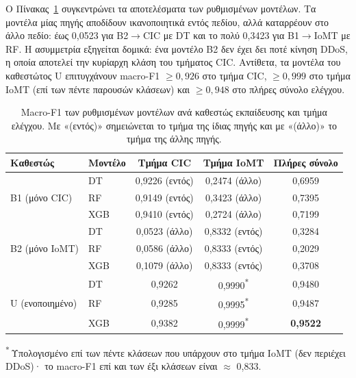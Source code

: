 Ο Πίνακας~\ref{gr:tab:regimes} συγκεντρώνει τα αποτελέσματα των ρυθμισμένων μοντέλων. Τα μοντέλα μίας πηγής αποδίδουν ικανοποιητικά εντός πεδίου, αλλά καταρρέουν στο άλλο πεδίο: έως 0,0523 για B2$\to$CIC με DT και το πολύ 0,3423 για B1$\to$IoMT με RF. Η ασυμμετρία εξηγείται δομικά: ένα μοντέλο B2 δεν έχει δει ποτέ κίνηση DDoS, η οποία αποτελεί την κυρίαρχη κλάση του τμήματος CIC. Αντίθετα, τα μοντέλα του καθεστώτος U επιτυγχάνουν macro-F1 $\geq 0{,}926$ στο τμήμα CIC, $\geq 0{,}999$ στο τμήμα IoMT (επί των πέντε παρουσών κλάσεων) και $\geq 0{,}948$ στο πλήρες σύνολο ελέγχου.

\begin{table}[!htbp]
\centering
\caption[]{Macro-F1 των ρυθμισμένων μοντέλων ανά καθεστώς εκπαίδευσης και τμήμα ελέγχου. Με «(εντός)» σημειώνεται το τμήμα της ίδιας πηγής και με «(άλλο)» το τμήμα της άλλης πηγής.}
\label{gr:tab:regimes}
\small
\begin{tabular}{@{}l l c c c@{}}
\toprule
\textbf{Καθεστώς} & \textbf{Μοντέλο} & \textbf{Τμήμα CIC} & \textbf{Τμήμα IoMT} & \textbf{Πλήρες σύνολο} \\
\midrule
\multirow{3}{*}{B1 (μόνο CIC)}  & DT  & 0,9226 (εντός) & 0,2474 (άλλο) & 0,6959 \\
                                & RF  & 0,9149 (εντός) & 0,3423 (άλλο) & 0,7395 \\
                                & XGB & 0,9410 (εντός) & 0,2724 (άλλο) & 0,7199 \\
\midrule
\multirow{3}{*}{B2 (μόνο IoMT)} & DT  & 0,0523 (άλλο) & 0,8332 (εντός) & 0,3284 \\
                                & RF  & 0,0586 (άλλο) & 0,8333 (εντός) & 0,2029 \\
                                & XGB & 0,1079 (άλλο) & 0,8333 (εντός) & 0,3708 \\
\midrule
\multirow{3}{*}{U (ενοποιημένο)} & DT  & 0,9262 & 0,9990\textsuperscript{*} & 0,9480 \\
                                 & RF  & 0,9285 & 0,9995\textsuperscript{*} & 0,9487 \\
                                 & XGB & 0,9382 & 0,9999\textsuperscript{*} & \textbf{0,9522} \\
\bottomrule
\end{tabular}

\vspace{0.3em}
\raggedright\footnotesize
\textsuperscript{*}\,Υπολογισμένο επί των πέντε κλάσεων που υπάρχουν στο τμήμα IoMT (δεν περιέχει DDoS)· το macro-F1 επί και των έξι κλάσεων είναι $\approx$ 0,833.
\end{table}


